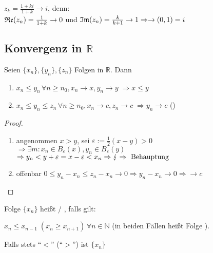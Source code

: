 \begin{example}
	$z_k=\frac{1+ki}{1+k}\to i$, denn: \\
	$\mathfrak{Re}(z_n)=\frac{1}{1+k}\to 0$ und $\mathfrak{Im}(z_n)=\frac{k}{k+1}\to 1\Rightarrow\to (0,1)=i$
\end{example}

\subsection{Konvergenz in $\mathbb{R}$}
\begin{proposition}
	Seien $\{x_n\},\{y_n\},\{z_n\}$ Folgen in $\mathbb{R}$. Dann
	\begin{enumerate}[label={\arabic*)}]
		\item $x_n \le y_n\,\forall n\ge n_0, x_n\rightarrow x, y_n\rightarrow y\;\Rightarrow x\le y$
		\item $x_n\le y_n\le z_n\,\forall n\ge n_0, x_n\rightarrow c,z_n\rightarrow c \;\Rightarrow y_n\rightarrow c$ ()
	\end{enumerate}
\end{proposition}
\begin{proof}
	\begin{enumerate}
		\item angenommen $x>y$, sei $\varepsilon :=\frac{1}{2}(x-y)>0$ \\
		$\Rightarrow\exists m: x_n\in B_{\varepsilon}(x), y_n\in B_{\varepsilon}(y)$ \\
		$\Rightarrow y_n< y+\varepsilon=x-\varepsilon<x_n\Rightarrow\lightning\Rightarrow \text{ Behauptung}$
		\item offenbar $0\le y_n-x_n\le z_n-x_n\to 0\Rightarrow y_n-x_n\to 0\Rightarrow\to c$
	\end{enumerate}
\end{proof}

\begin{definition}[monoton]
	Folge $\{x_n\}$ heißt  / , falls gilt:
	
	$x_n \le x_{n-1}\;(x_n\ge x_{n+1})\,\forall n\in\mathbb{N}$ (in beiden Fällen heißt Folge ).
	
	Falls stets "`$<$"' ("`$>$"') ist $\{x_n\}$ 
\end{definition}

